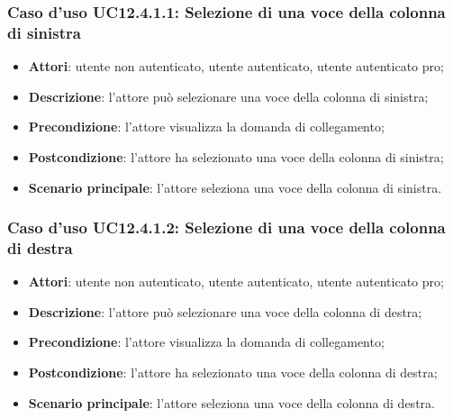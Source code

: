 \subsubsection{Caso d'uso UC12.4.1.1: Selezione di una voce della colonna di sinistra}
\begin{itemize}
\item \textbf{Attori}: utente non autenticato, utente autenticato, utente autenticato pro;
\item \textbf{Descrizione}: l'attore può selezionare una voce della colonna di sinistra;
\item \textbf{Precondizione}: l'attore visualizza la domanda di collegamento;
\item \textbf{Postcondizione}: l'attore ha selezionato una voce della colonna di sinistra;
\item \textbf{Scenario principale}: l'attore seleziona una voce della colonna di sinistra. 
\end{itemize}

\subsubsection{Caso d'uso UC12.4.1.2: Selezione di una voce della colonna di destra}
\begin{itemize}
\item \textbf{Attori}: utente non autenticato, utente autenticato, utente autenticato pro;
\item \textbf{Descrizione}: l'attore può selezionare una voce della colonna di destra;
\item \textbf{Precondizione}: l'attore visualizza la domanda di collegamento;
\item \textbf{Postcondizione}: l'attore ha selezionato una voce della colonna di destra;
\item \textbf{Scenario principale}: l'attore seleziona una voce della colonna di destra. 
\end{itemize}

